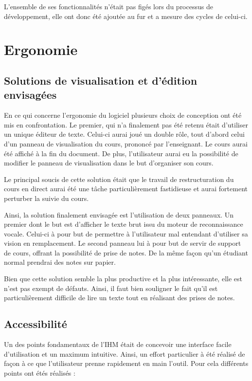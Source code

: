 L'ensemble de ses fonctionnalités n'était pas figés lors du processus de développement, elle ont donc été ajoutée au fur et a mesure des cycles de celui-ci.

\section{Ergonomie}

\subsection{Solutions de visualisation et d'édition envisagées}

En ce qui concerne l'ergonomie du logiciel plusieurs choix de conception ont été mis en confrontation. Le premier, qui n'a finalement pas été retenu était d'utiliser un unique éditeur de texte. Celui-ci aurai joué un  double rôle, tout d'abord celui d'un panneau de visualisation du cours, prononcé par l'enseignant. Le cours aurai été affiché à la fin du document. De plus, l'utilisateur aurai eu la possibilité de modifier le panneau de visualisation dans le but d'organiser son  cours.

Le principal soucis de cette solution était que le travail de restructuration du cours en direct aurai été une tâche particulièrement fastidieuse et aurai fortement perturber la suivie du cours.

Ainsi, la solution finalement envisagée est l'utilisation de deux panneaux. Un premier dont le but est d'afficher le texte brut issu du moteur de reconnaissance vocale. Celui-ci à pour but de permettre à l'utilisateur mal entendant d'utiliser sa  vision en remplacement. Le second panneau lui à pour but de servir de support de cours, offrant la possibilité de prise de notes. De la même façon qu'un étudiant normal prendrai des notes sur papier.

Bien que cette solution semble la plus productive et la plus intéressante, elle est n'est pas exempt de défauts. Ainsi, il faut bien souligner le fait qu'il est particulièrement difficile de lire un texte tout en réalisant des prises de notes.     




\subsection{Accessibilité}

Un des points fondamentaux de l'IHM était de concevoir une interface facile d'utilisation et un maximum intuitive. Ainsi, un effort particulier à été réalisé de façon à ce que l'utilisateur prenne rapidement en main l'outil. Pour cela différents points ont étés réalisés :


